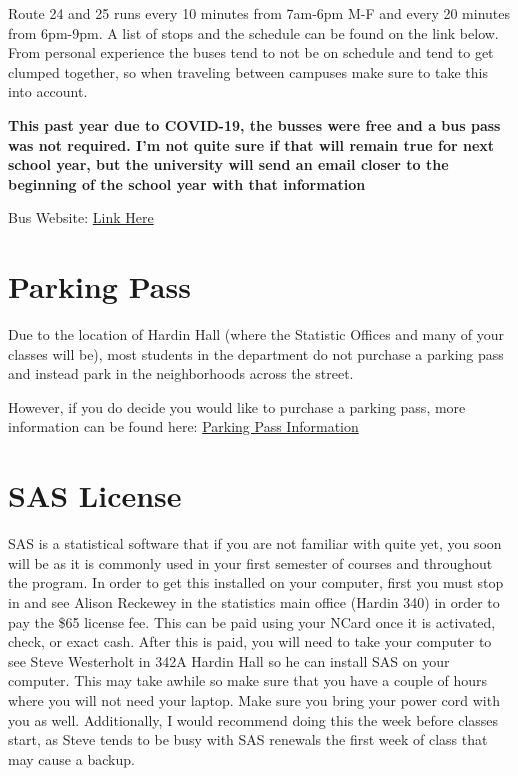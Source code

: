 \documentclass[
  12pt,
]{book}
\begin{document}
Route 24 and 25 runs every 10 minutes from 7am-6pm M-F and every 20 minutes from 6pm-9pm. A list of stops and the schedule can be found on the link below. From personal experience the buses tend to not be on schedule and tend to get clumped together, so when traveling between campuses make sure to take this into account.

\textbf{This past year due to COVID-19, the busses were free and a bus pass was not required. I'm not quite sure if that will remain true for next school year, but the university will send an email closer to the beginning of the school year with that information}

Bus Website: \href{https://parking.unl.edu/campus-bus-service}{Link Here}

\hypertarget{parking-pass}{%
\section{Parking Pass}\label{parking-pass}}

Due to the location of Hardin Hall (where the Statistic Offices and many of your classes will be), most students in the department do not purchase a parking pass and instead park in the neighborhoods across the street.

However, if you do decide you would like to purchase a parking pass, more information can be found here: \href{https://parking.unl.edu/}{Parking Pass Information}

\hypertarget{sas-license}{%
\section{SAS License}\label{sas-license}}

SAS is a statistical software that if you are not familiar with quite yet, you soon will be as it is commonly used in your first semester of courses and throughout the program. In order to get this installed on your computer, first you must stop in and see Alison Reckewey in the statistics main office (Hardin 340) in order to pay the \$65 license fee. This can be paid using your NCard once it is activated, check, or exact cash. After this is paid, you will need to take your computer to see Steve Westerholt in 342A Hardin Hall so he can install SAS on your computer. This may take awhile so make sure that you have a couple of hours where you will not need your laptop. Make sure you bring your power cord with you as well. Additionally, I would recommend doing this the week before classes start, as Steve tends to be busy with SAS renewals the first week of class that may cause a backup.
\end{document}
